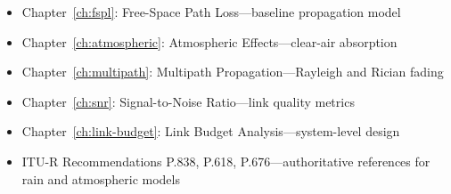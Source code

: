 \begin{itemize}
\item Chapter~\ref{ch:fspl}: Free-Space Path Loss---baseline propagation model
\item Chapter~\ref{ch:atmospheric}: Atmospheric Effects---clear-air absorption
\item Chapter~\ref{ch:multipath}: Multipath Propagation---Rayleigh and Rician fading
\item Chapter~\ref{ch:snr}: Signal-to-Noise Ratio---link quality metrics
\item Chapter~\ref{ch:link-budget}: Link Budget Analysis---system-level design
\item ITU-R Recommendations P.838, P.618, P.676---authoritative references for rain and atmospheric models
\end{itemize}
